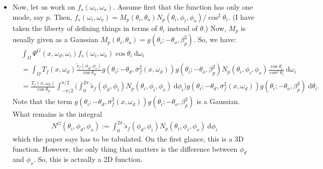 \documentclass[10pt]{article}
\newcommand{\dee}{\mathrm{d}}
\begin{document}
\begin{itemize}
    \item Now, let us work on $f_s(\omega_i, \omega_o)$.  Assume first that the function has only one mode, say $p$.  Then, $f_s(\omega_i, \omega_o) = M_p(\theta_i, \theta_o) N_p(\theta_i, \phi_i, \phi_o) / \cos^2 \theta_i$.  (I have taken the liberty of defining things in terms of $\theta_i$ instead of $\theta$.)  Now, $M_p$ is usually given as a Gaussian $M_p(\theta_i, \theta_o) = g(\theta_i; -\theta_o, \beta_p^2)$.  So, we have:
    \begin{align*}
      & \int_\Omega \Psi^G(x, \omega_d, \omega_i) f_s(\omega_i, \omega_o) \cos \theta_i\ \dee \omega_i \\
      &= \int_\Omega T_f(x, \omega_d) \frac{\tilde{s}_f(\phi_d, \phi_i)}{\cos \theta_d} g(\theta_i; -\theta_d, \bar{\sigma}_f^2(x, \omega_d)) g(\theta_i; -\theta_o, \beta_p^2) N_p(\theta_i, \phi_i, \phi_o) \frac{\cos \theta_i}{\cos^2 \theta_i}\ \dee \omega_i \\
      &= \frac{T_f(x, \omega_d)}{\cos \theta_d} \int_{-\pi/2}^{\pi/2} \bigg( \int_{0}^{2\pi} \tilde{s}_f(\phi_d, \phi_i) N_p(\theta_i, \phi_i, \phi_o) \ \dee\phi_i\bigg) g(\theta_i; -\theta_d, \bar{\sigma}_f^2(x, \omega_d)) g(\theta_i; -\theta_o, \beta_p^2)\ \dee\theta_i.
    \end{align*}
    Note that the term $g(\theta_i; -\theta_d, \bar{\sigma}_f^2(x, \omega_d)) g(\theta_i; -\theta_o, \beta_p^2)$ is a Gaussian.  What remains is the integral 
    \begin{align*}
      N^G(\theta_i, \phi_d, \phi_o) := \int_{0}^{2\pi} \tilde{s}_f(\phi_d, \phi_i) N_p(\theta_i, \phi_i, \phi_o) \ \dee\phi_i
    \end{align*}
    which the paper says has to be tabulated.  On the first glance, this is a 3D function.  However, the only thing that matters is the difference between $\phi_d$ and $\phi_o$. So, this is actually a 2D function.
  \end{itemize}

  
    
\end{document}
